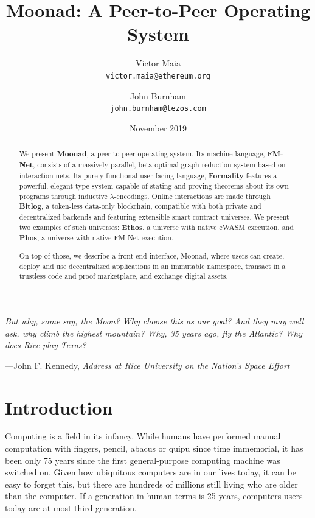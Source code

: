 \documentclass{article}
\theoremstyle{definition}
\theoremstyle{theorem}
\begin{document}
\title{Moonad: A Peer-to-Peer Operating System}
\author{
  Victor Maia\\
  \texttt{victor.maia@ethereum.org}
  \and
  John Burnham\\
  \texttt{john.burnham@tezos.com}
}
\date{November 2019}
\maketitle

\setlength{}
\setlength\epigraphrule{0pt}

\epigraph{\itshape But why, some say, the Moon? Why choose this as our goal? And
they may well ask, why climb the highest mountain? Why, 35 years ago, fly the
Atlantic? Why does Rice play Texas?}{---John F. Kennedy, \textit{Address at
Rice University on the Nation's Space Effort}}

\begin{abstract}
We present \textbf{Moonad}, a peer-to-peer operating system. Its machine
language, \textbf{FM-Net}, consists of a massively parallel, beta-optimal
graph-reduction system based on interaction nets. Its purely functional
user-facing language, \textbf{Formality} features a powerful, elegant
type-system capable of stating and proving theorems about its own programs
through inductive $\lambda$-encodings.  Online interactions are made through
\textbf{Bitlog}, a
token-less data-only blockchain, compatible with both private and decentralized
backends and featuring extensible smart contract universes. We
present two examples of such universes: \textbf{Ethos}, a universe with native
eWASM execution, and \textbf{Phos}, a universe with native FM-Net execution.

On top of those, we describe a front-end interface, Moonad, where users
can create, deploy and use decentralized applications in an immutable namespace,
transact in a trustless code and proof marketplace, and exchange digital assets.
\end{abstract}

\newpage
\tableofcontents
\newpage

\section{Introduction} 

Computing is a field in its infancy. While humans have performed manual
computation with fingers, pencil, abacus or quipu since time immemorial, it has
been only 75 years since the first general-purpose computing machine was
switched on. Given how ubiquitous computers are in our lives today, it can be
easy to forget this, but there are hundreds of millions still living who are
older than the computer. If a generation in human terms is 25 years, computers
users today are at most third-generation.
\end{document}
